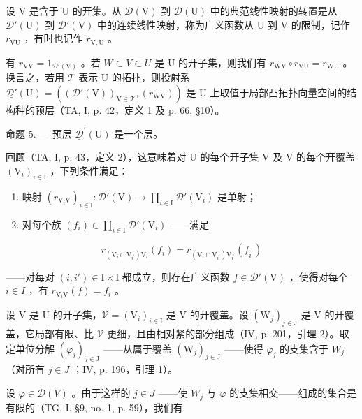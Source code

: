 设 V 是含于 U 的开集。从 \(\mathcal{D}(\mathrm{V})\) 到 \(\mathcal{D}(\mathrm{U})\) 中的典范线性映射的转置是从 \(\mathcal{D}'(\mathrm{U})\) 到 \(\mathcal{D}'(\mathrm{V})\) 中的连续线性映射，称为广义函数从 U 到 V 的限制，记作 \(r_{\mathrm{VU}}\) ，有时也记作 \(r_{\mathrm{V,U}}\) 。

有 \(r_{\mathrm{VV}} = 1_{\mathcal{D}'(\mathrm{V})}\) 。若 \(W \subset V \subset U\) 是 U 的开子集，则我们有 \(r_{\mathrm{WV}} \circ r_{\mathrm{VU}} = r_{\mathrm{WU}}\) 。换言之，若用 \(\mathcal{T}\) 表示 U 的拓扑，则投射系 \(\underline{\mathcal{D}'}(\mathrm{U}) = ((\mathcal{D}'(\mathrm{V}))_{\mathrm{V} \in \mathcal{T}}, (r_{\mathrm{WV}}))\) 是 U 上取值于局部凸拓扑向量空间的结构种的预层（TA, I, p. 42，定义 1 及 p. 66, §10）。

命题 5. --- 预层 \(\underline{\mathcal{D}}^{\prime}(\mathrm{U})\) 是一个层。

回顾（TA, I, p. 43，定义 2），这意味着对 U 的每个开子集 V 及 V 的每个开覆盖 \((\mathrm{V}_{i})_{i\in\mathrm{I}}\) ，下列条件满足：

\begin{enumerate}
\def\labelenumi{(\roman{enumi})}
\item
  映射 \((r_{\mathrm{V}_i\mathrm{V}})_{i\in \mathrm{I}}\colon \mathcal{D}'(\mathrm{V})\to \prod_{i\in \mathrm{I}}\mathcal{D}'(\mathrm{V}_i)\) 是单射；
\item
  对每个族 \((f_i)\in \prod_{i\in \mathrm{I}}\mathcal{D}'(\mathrm{V}_i)\) ——满足
\end{enumerate}

\[
r _ {(\mathrm{V} _ {i} \cap \mathrm{V} _ {i ^ {\prime}}) \mathrm{V} _ {i}} (f _ {i}) = r _ {(\mathrm{V} _ {i} \cap \mathrm{V} _ {i ^ {\prime}}) \mathrm{V} _ {i ^ {\prime}}} (f _ {i ^ {\prime}})
\]

——对每对 \((i, i') \in \mathrm{I} \times \mathrm{I}\) 都成立，则存在广义函数 \(f \in \mathcal{D}'(\mathrm{V})\) ，使得对每个 \(i \in I\) ，有 \(r_{\mathrm{V}_{i}\mathrm{V}}(f) = f_{i}\) 。

设 V 是 U 的开子集，\(\mathcal{V} = (\mathrm{V}_{i})_{i \in \mathrm{I}}\) 是 V 的开覆盖。设 \((\mathrm{W}_{j})_{j \in \mathrm{J}}\) 是 V 的开覆盖，它局部有限、比 \(\mathcal{V}\) 更细，且由相对紧的部分组成（IV, p. 201，引理 2）。取定单位分解 \((\varphi_{j})_{j \in \mathrm{J}}\) ——从属于覆盖 \((\mathrm{W}_{j})_{j \in \mathrm{J}}\) ——使得 \(\varphi_{j}\) 的支集含于 \(W_{j}\) （对所有 \(j \in J\) ；IV, p. 196，引理 1）。

设 \(\varphi\in\mathcal{D}(V)\) 。由于这样的 \(j\in J\) ——使 \(W_{j}\) 与 \(\varphi\) 的支集相交——组成的集合是有限的（TG, I, §9, no. 1, p. 59），我们有

